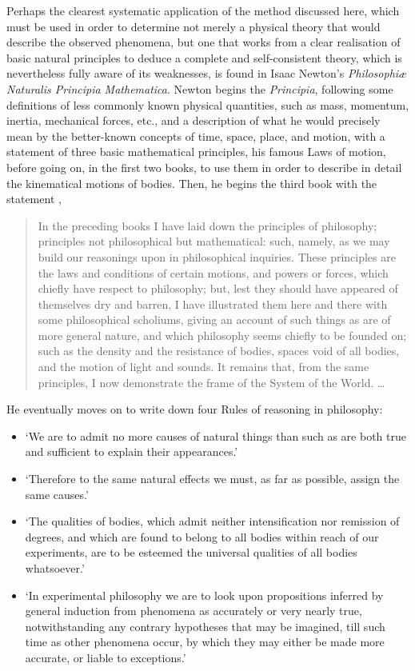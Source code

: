 Perhaps the clearest systematic application of the method discussed here, which must be used in order to determine not merely a physical theory that would describe the observed phenomena, but one that works from a clear realisation of basic natural principles to deduce a complete and self-consistent theory, which is nevertheless fully aware of its weaknesses, is found in Isaac Newton's \textit{Philosophi{\ae} Naturalis Principia Mathematica}. Newton begins the \textit{Principia}, following some definitions of less commonly known physical quantities, such as mass, momentum, inertia, mechanical forces, etc., and a description of what he would precisely mean by the better-known concepts of time, space, place, and motion, with a statement of three basic mathematical principles, his famous Laws of motion, before going on, in the first two books, to use them in order to describe in detail the kinematical motions of bodies. Then, he begins the third book with the statement \cite{Newton1966},
\begin{quotation}
In the preceding books I have laid down the principles of philosophy; principles not philosophical but mathematical: such, namely, as we may build our reasonings upon in philosophical inquiries. These principles are the laws and conditions of certain motions, and powers or forces, which chiefly have respect to philosophy; but, lest they should have appeared of themselves dry and barren, I have illustrated them here and there with some philosophical scholiums, giving an account of such things as are of more general nature, and which philosophy seems chiefly to be founded on; such as the density and the resistance of bodies, spaces void of all bodies, and the motion of light and sounds. It remains that, from the same principles, I now demonstrate the frame of the System of the World. \ldots
\end{quotation} 
He eventually moves on to write down four Rules of reasoning in philosophy:
\begin{itemize}
\item[I]{`We are to admit no more causes of natural things than such as are both true and sufficient to explain their appearances.'}
\item[II]{`Therefore to the same natural effects we must, as far as possible, assign the same causes.'}
\item[III]{`The qualities of bodies, which admit neither intensification nor remission of degrees, and which are found to belong to all bodies within reach of our experiments, are to be esteemed the universal qualities of all bodies whatsoever.'}
\item[IV]{`In experimental philosophy we are to look upon propositions inferred by general induction from phenomena as accurately or very nearly true, notwithstanding any contrary hypotheses that may be imagined, till such time as other phenomena occur, by which they may either be made more accurate, or liable to exceptions.'}
\end{itemize}
